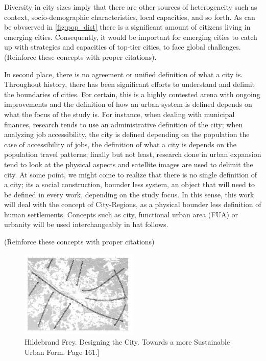 Diversity in city sizes imply that there are other sources of heterogeneity such as context, socio-demographic characteristics, local capacities, and so forth. As can be obvserved in \ref{fig:pop_dist} there is a significant amount of citizens living in emerging cities. Consequently, it would be important for emerging cities to catch up with strategies and capacities of top-tier cities, to face global challenges. 
(Reinforce these concepts with proper citations). \par


In second place, there is no agreement or unified definition of what a city is. Throughout history, there has been significant efforts to understand and delimit the boundaries of cities. For certain, this is a highly contested arena with ongoing improvements and the definition of how an urban system is defined depends on what the focus of the study is. For instance, when dealing with municipal finances, research tends to use an administrative definition of the city; when analyzing job accessibility, the city is defined depending on the population  the case of accessibility of jobs, the definition of what a city is depends on the population travel patterns; finally but not least, research done in urban expansion tend to look at the physical aspects and satellite images are used to delimit the city. 
At some point, we might come to realize that there is no single definition of a city; its a social construction, bounder less system, an object that will need to be defined in every work, depending on the study focus. In this sense, this work will deal with the concept of City-Regions, as a physical bounder less definition of human settlements. Concepts such as city, functional urban area (FUA) or urbanity will be used interchangeably in hat follows. 

(Reinforce these concepts with proper citations) \par



\begin{figure}[hbt!]
    \centering
    \includegraphics[width=0.5\textwidth]{Imgs/2_fua.PNG}
    \caption{Hildebrand Frey. Designing the City. Towards a more Sustainable Urban Form. Page 161.]}
    \label{fig:fua}
\end{figure}

